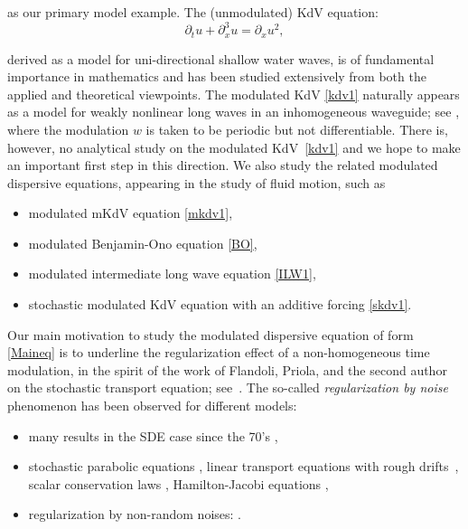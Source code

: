 \documentclass[letterpaper, 11pt,  reqno]{amsart}
\newcommand{\1}{\hspace{0.5mm}\text{I}\hspace{0.5mm}}
\newcommand{\noi}{\noindent}
\newcommand{\dx}{\partial_x}
\newcommand{\dt}{\partial_t}
\numberwithin{equation}{section}
\numberwithin{theorem}{section}
\begin{document}
\noi
as our primary model example. 
The (unmodulated) KdV equation:
\begin{equation}
\dt u+  \dx^3 u  =\dx u^2, 
\label{kdv2}
\end{equation}


\noi
derived as a model for uni-directional shallow water waves, 
is of fundamental importance
 in mathematics and has been studied extensively
 from both the applied and theoretical viewpoints.
The modulated KdV \eqref{kdv1} naturally appears 
as a model 
for
weakly nonlinear long waves in an inhomogeneous waveguide;
see \cite{CMG, HZ}, where 
the modulation $w$ is taken to be periodic but not differentiable.
There is, however, no analytical study  on the modulated KdV~\eqref{kdv1}
and we hope to make an important first step in this direction.
We also study the related modulated dispersive equations, 
appearing in the study of fluid motion, 
such as 

\smallskip
\begin{itemize}
\item modulated mKdV equation \eqref{mkdv1}, 

\smallskip
\item 
modulated Benjamin-Ono equation \eqref{BO}, 

\smallskip
\item 
modulated intermediate long wave equation \eqref{ILW1}, 

\smallskip
\item 
stochastic modulated KdV equation with an additive forcing \eqref{skdv1}.

\end{itemize}




Our main motivation to study the modulated dispersive equation of 
form \eqref{Maineq} 
is 
to underline the regularization effect of a non-homogeneous time modulation,
in the spirit of the  work of Flandoli, Priola, and the second author on the stochastic transport equation; 
see~\cite{FGP}. 
The so-called {\it regularization by noise}
phenomenon
 has been observed for different models:



\smallskip

\begin{itemize}
\item
many results in the SDE case since the 70's
\cite{Zv, Ver, KR, Davie, DF, 
CatellierGubinelli, DFRV}, 



\smallskip
\item 
stochastic parabolic equations
\cite{GP, GLT, DGT12, BM}, 
linear transport equations with rough drifts~\cite{FGP}, 
scalar conservation laws \cite{CGess},  
Hamilton-Jacobi equations \cite{LS}, 




\smallskip
\item 
regularization by non-random noises:
\cite{GG0, FHLN, RT}.

\end{itemize}
\end{document}
